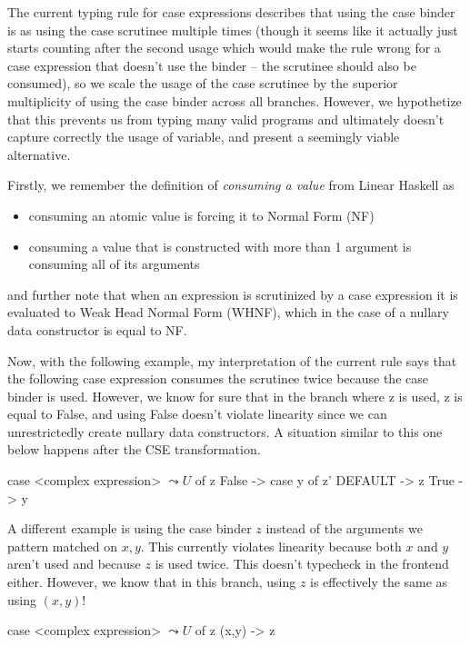 \documentclass[a4paper, draft]{article}
\begin{document}
The current typing rule for case expressions describes that using the case
binder is as using the case scrutinee multiple times (though it seems like it
actually just starts counting after the second usage which would make the rule
wrong for a case expression that doesn't use the binder -- the scrutinee should
also be consumed), so we scale the usage of
the case scrutinee by the superior multiplicity of using the case binder across
all branches. However, we hypothetize that this prevents us from typing many
valid programs and ultimately doesn't capture correctly the usage of variable,
and present a seemingly viable alternative.

Firstly, we remember the definition of \emph{consuming a value} from Linear
Haskell as
\begin{itemize}
    \item consuming an atomic value is forcing it to Normal Form (NF)
    \item consuming a value that is constructed with more than 1 argument is
        consuming all of its arguments
\end{itemize}
and further note that when an expression is scrutinized by a case expression it
is evaluated to Weak Head Normal Form (WHNF), which in the case of a nullary data
constructor is equal to NF.

Now, with the following example, my interpretation of the current rule says that
the following case expression consumes the scrutinee twice because the case
binder is used. However, we know for sure that in the branch where z is used, z
is equal to False, and using False doesn't violate linearity since we can
unrestrictedly create nullary data constructors. A situation similar to this one
below happens after the CSE transformation.
\begin{code}
    case <complex expression> $\leadsto U$ of z {
        False -> case y of z' { DEFAULT -> z }
        True  -> y
    }
\end{code}

A different example is using the case binder $z$ instead of the arguments we
pattern matched on $x,y$. This currently violates linearity because both $x$ and
$y$ aren't used and because $z$ is used twice. This doesn't typecheck in the
frontend either. However, we know that in this branch, using $z$ is effectively
the same as using $(x,y)$!
\begin{code}
    case <complex expression> $\leadsto U$ of z {
        (x,y) -> z
    }
\end{code}
\end{document}
